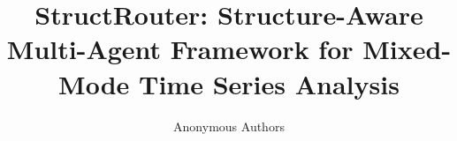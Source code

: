 \documentclass[sigconf, screen, review, anonymous]{acmart}
\begin{document}
\title{StructRouter: Structure-Aware Multi-Agent Framework for Mixed-Mode Time Series Analysis}

\def\model{StructRouter\xspace}

\newcommand{\update}[1]{{\textcolor{black}{#1}}}
\newcommand{\boldres}[1]{{\textbf{\textcolor{red}{#1}}}}
\newcommand{\secondres}[1]{{\underline{\textcolor{blue}{#1}}}}

\newcommand{\Function}[2]{\STATE\textbf{function} \text{#1}$(#2)$}
\newcommand{\EndFunction}{\STATE\textbf{end function}}
\newcommand{\Comment}[1]{\STATE{\(\triangleright\) #1}}

\author{Anonymous Authors}



\maketitle






\newpage



\appendix

%
\end{document}
